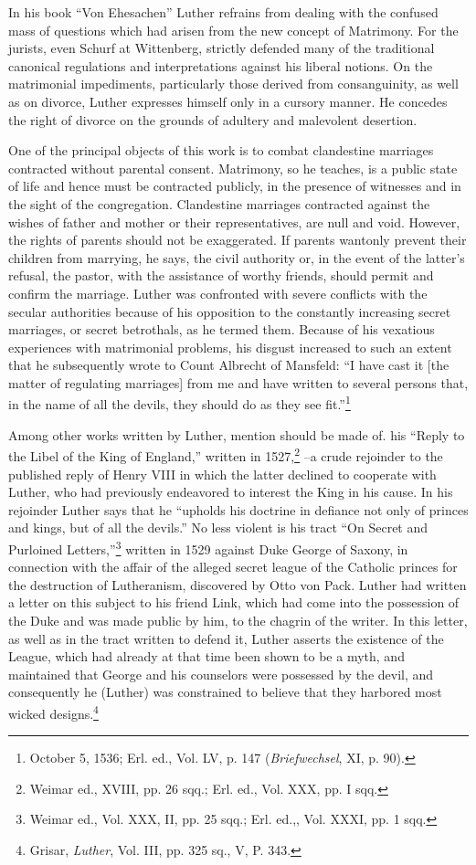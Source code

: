 In his book “Von Ehesachen” Luther refrains from dealing with the
confused mass of questions which had arisen from the new concept
of Matrimony. For the jurists, even Schurf at Wittenberg, strictly defended
many of the traditional canonical regulations and interpretations against
his liberal notions. On the matrimonial impediments,
particularly those derived from consanguinity, as well as on divorce,
Luther expresses himself only in a cursory manner. He concedes
the right of divorce on the grounds of adultery and malevolent desertion.

One of the principal objects of this work is to combat clandestine
marriages contracted without parental consent. Matrimony, so he
teaches, is a public state of life and hence must be contracted publicly,
in the presence of witnesses and in the sight of the congregation.
Clandestine marriages contracted against the wishes of father and
mother or their representatives, are null and void. However, the
rights of parents should not be exaggerated. If parents wantonly prevent
their children from marrying, he says, the civil authority or, in
the event of the latter’s refusal, the pastor, with the assistance of
worthy friends, should permit and confirm the marriage. Luther was
confronted with severe conflicts with the secular authorities because
of his opposition to the constantly increasing secret marriages, or
secret betrothals, as he termed them. Because of his vexatious experiences
with matrimonial problems, his disgust increased to such an extent
that he subsequently wrote to Count Albrecht of Mansfeld:
“I have cast it [the matter of regulating marriages] from me and have
written to several persons that, in the name of all the devils, they
should do as they see fit.”\footnote{October 5, 1536; Erl. ed., Vol. LV, p. 147 (\textit{Briefwechsel}, XI, p. 90).}

Among other works written by Luther, mention should be made of.
his “Reply to the Libel of the King of England,” written in 1527,\footnote{Weimar ed., XVIII, pp. 26 sqq.; Erl. ed., Vol. XXX, pp. I sqq.}
--a crude rejoinder to the published reply of Henry VIII in which
the latter declined to cooperate with Luther, who had previously endeavored
to interest the King in his cause. In his rejoinder Luther says
that he “upholds his doctrine in defiance not only of princes and
kings, but of all the devils.” No less violent is his tract “On Secret and
Purloined Letters,”\footnote{Weimar ed., Vol. XXX, II, pp. 25 sqq.; Erl. ed.,, Vol. XXXI, pp. 1 sqq.}
 written in 1529 against Duke George of Saxony,
in connection with the affair of the alleged secret league of the Catholic
princes for the destruction of Lutheranism, discovered by Otto
von Pack. Luther had written a letter on this subject to his friend
Link, which had come into the possession of the Duke and was made
public by him, to the chagrin of the writer. In this letter, as well as
in the tract written to defend it, Luther asserts the existence of the
League, which had already at that time been shown to be a myth, and
maintained that George and his counselors were possessed by the devil,
and consequently he (Luther) was constrained to believe that they
harbored most wicked designs.\footnote{Grisar, \textit{Luther}, Vol. III, pp. 325 sq., V, P. 343.}

